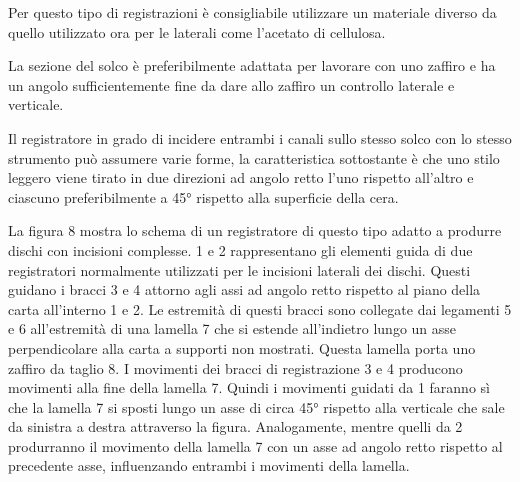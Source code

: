 \documentclass[11pt]{article}
\begin{document}
\begin{multicols*}{2}
Per questo tipo di registrazioni è consigliabile utilizzare un materiale diverso da quello utilizzato ora per le laterali come l’acetato di cellulosa.

La sezione del solco è preferibilmente adattata per lavorare con uno zaffiro e ha un angolo sufficientemente fine da dare allo zaffiro un controllo laterale e verticale.
 
Il registratore in grado di incidere entrambi i canali sullo stesso solco con lo stesso strumento può assumere varie forme, la caratteristica sottostante è che uno stilo leggero viene tirato in due direzioni ad angolo retto l'uno rispetto all'altro e ciascuno preferibilmente a 45° rispetto alla superficie della cera.

La figura 8 mostra lo schema di un registratore di questo tipo adatto a produrre dischi con incisioni complesse. 1 e 2 rappresentano gli elementi guida di due registratori normalmente utilizzati per le incisioni laterali dei dischi. Questi guidano i bracci 3 e 4 attorno agli assi ad angolo retto rispetto al piano della carta all’interno 1 e 2. Le estremità di questi bracci sono collegate dai legamenti 5 e 6 all'estremità di una lamella 7 che si estende all'indietro lungo un asse perpendicolare alla carta a supporti non mostrati. Questa lamella porta uno zaffiro da taglio 8. I movimenti dei bracci di registrazione 3 e 4 producono movimenti alla fine della lamella 7. Quindi i movimenti guidati da 1 faranno sì che la lamella 7 si sposti lungo un asse di circa 45° rispetto alla verticale che sale da sinistra a destra attraverso la figura. Analogamente, mentre quelli da 2 produrranno il movimento della lamella 7 con un asse ad angolo retto rispetto al precedente asse, influenzando entrambi i movimenti della lamella.


\end{multicols*}
\end{document}
